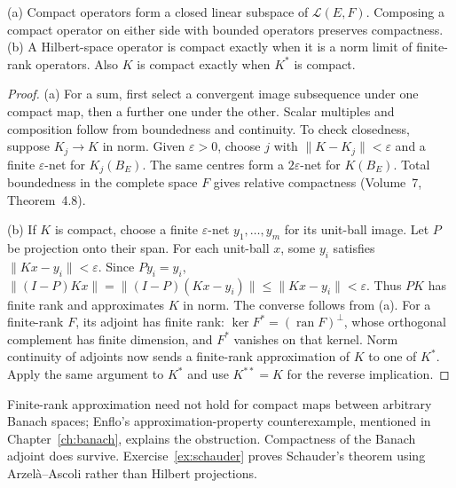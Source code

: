 \begin{proposition}\label{prop:compactops}
(a) Compact operators form a closed linear subspace of $\mathcal L(E,F)$. Composing a compact operator on either side with bounded operators preserves compactness.
(b) A Hilbert-space operator is compact exactly when it is a norm limit of finite-rank operators. Also $K$ is compact exactly when $K^*$ is compact.
\end{proposition}
\begin{proof}
(a) For a sum, first select a convergent image subsequence under one compact map, then a further one under the other. Scalar multiples and composition follow from boundedness and continuity. To check closedness, suppose $K_j\to K$ in norm. Given $\varepsilon>0$, choose $j$ with $\|K-K_j\|<\varepsilon$ and a finite $\varepsilon$-net for $K_j(B_E)$. The same centres form a $2\varepsilon$-net for $K(B_E)$. Total boundedness in the complete space $F$ gives relative compactness (Volume~7, Theorem~4.8).

(b) If $K$ is compact, choose a finite $\varepsilon$-net $y_1,\ldots,y_m$ for its unit-ball image. Let $P$ be projection onto their span. For each unit-ball $x$, some $y_i$ satisfies $\|Kx-y_i\|<\varepsilon$. Since $Py_i=y_i$,
$\|(I-P)Kx\|=\|(I-P)(Kx-y_i)\|\le\|Kx-y_i\|<\varepsilon$.
Thus $PK$ has finite rank and approximates $K$ in norm. The converse follows from (a).
For a finite-rank $F$, its adjoint has finite rank: $\ker F^*=(\operatorname{ran}F)^\perp$, whose orthogonal complement has finite dimension, and $F^*$ vanishes on that kernel. Norm continuity of adjoints now sends a finite-rank approximation of $K$ to one of $K^*$. Apply the same argument to $K^*$ and use $K^{**}=K$ for the reverse implication.
\end{proof}

Finite-rank approximation need not hold for compact maps between arbitrary Banach spaces; Enflo's approximation-property counterexample, mentioned in Chapter~\ref{ch:banach}, explains the obstruction. Compactness of the Banach adjoint does survive. Exercise~\ref{ex:schauder} proves Schauder's theorem using Arzel\`a--Ascoli rather than Hilbert projections.

